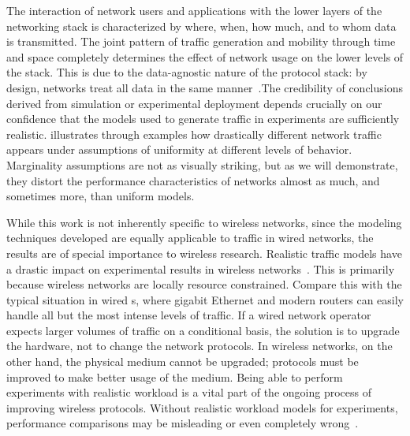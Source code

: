 \documentclass[twocolumn,final]{svjour3}
\begin{document}
The interaction of network users and applications with the lower layers of the networking stack is characterized by where, when, how much, and to whom data is transmitted. The joint pattern of traffic generation and mobility through time and space completely determines the effect of network usage on the lower levels of the stack. This is due to the data-agnostic nature of the protocol stack: by design,  networks treat all data in the same manner~\cite{Clark88}.\QoSnote The credibility of conclusions derived from simulation or experimental deployment depends crucially on our confidence that the models used to generate traffic in experiments are sufficiently realistic.  illustrates through examples how drastically different network traffic appears under assumptions of uniformity at different levels of behavior. Marginality assumptions are not as visually striking, but as we will demonstrate, they distort the performance characteristics of networks almost as much, and sometimes more, than uniform models.

While this work is not inherently specific to wireless networks, since the modeling techniques developed are equally applicable to traffic in wired networks, the results are of special importance to wireless research.
Realistic traffic models have a drastic impact on experimental results in wireless networks~\cite{Karpinski07:realism,Karpinski07:cbr-failure}.
This is primarily because wireless networks are locally resource constrained.
Compare this with the typical situation in wired s, where gigabit Ethernet and modern routers  can easily handle all but the most intense levels of traffic.
If a wired network operator expects larger volumes of traffic on a conditional basis, the solution is to upgrade the hardware, not to change the network protocols.
In wireless networks, on the other hand, the physical medium cannot be upgraded; protocols must be improved to make better usage of the medium.
Being able to perform experiments with realistic workload is a vital part of the ongoing process of improving wireless protocols.
Without realistic workload models for experiments, performance comparisons may be misleading or even completely wrong~\cite{Karpinski07:cbr-failure}.
\end{document}

